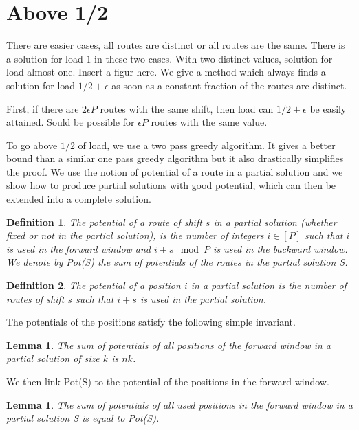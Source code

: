 \documentclass[10pt, conference, letterpaper]{IEEEtran}
\newtheorem{lemma}[theorem]{Lemma}
\newtheorem{definition}{Definition}
\begin{document}
\section{Above 1/2}


There are easier cases, all routes are distinct or all routes are the same. There is a solution for load $1$ in these two cases. 
With two distinct values, solution for load almost one. Insert a figur here.
We  give a method which always finds a solution for load $1/2 + \epsilon$ as soon as a constant fraction of the routes are distinct. 

First, if there are $2\epsilon P$ routes with the same shift,
then load can $1/2 + \epsilon$ be easily attained. Sould be possible
for $\epsilon P$ routes with the same value.


To go above $1/2$ of load, we use a two pass greedy algorithm. It gives a better bound than a similar one pass greedy algorithm but it also drastically simplifies the proof.
We use the notion of potential of a route in a partial solution and we show how to produce partial solutions with good potential, which can then be extended into a complete solution.

\begin{definition}
The potential of a route of shift $s$ in a partial solution (whether fixed or not in the partial solution),
is the number of integers $i \in [P]$ such that $i$ is used in the forward window and $i+s \mod P$ is used in the backward window. We denote by Pot(S) the sum of potentials of the routes in the partial solution S.
\end{definition} 


\begin{definition}
The potential of a position $i$ in a partial solution is the number of routes of shift $s$ such that $i+s$ is used in the partial solution. 
\end{definition}

The potentials of the positions satisfy the following simple invariant.
\begin{lemma}\label{lemma:inv}
The sum of potentials of all positions of the forward window in a partial solution of size $k$ is $nk$.  
\end{lemma}

We then link Pot(S) to the potential of the positions in the forward window.
\begin{lemma}\label{lemma:pot_pos}
The sum of potentials of all used positions in the forward window in a partial solution S is equal to Pot(S).  
\end{lemma}
 
\end{document}
